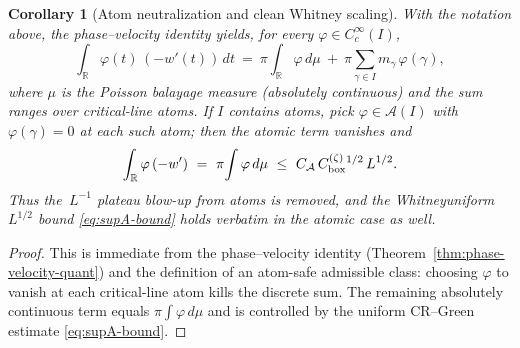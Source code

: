 \documentclass[11pt]{article}
\newtheorem{corollary}[theorem]{Corollary}
\theoremstyle{definition}
\theoremstyle{remark}
\theoremstyle{definition}
\newcommand{\R}{\mathbb{R}}
\begin{document}
\begin{corollary}[Atom neutralization and clean Whitney scaling]\label{cor:atom-safe}
With the notation above, the phase--velocity identity yields, for every \(\varphi\in C_c^\infty(I)\),
\[
  \int_{\R}\varphi(t)\,(-w'(t))\,dt
  \ =\ \pi\!\int_{\R}\varphi\,d\mu\ +\ \pi\sum_{\gamma\in I} m_\gamma\,\varphi(\gamma),
\]
where \(\mu\) is the Poisson balayage measure (absolutely continuous) and the sum ranges over critical-line atoms.
If \(I\) contains atoms, pick \(\varphi\in\mathcal A(I)\) with \(\varphi(\gamma)=0\) at each such atom; then the atomic term vanishes and
\[
  \int_{\R}\varphi\,(-w')\ =\ \pi\!\int \varphi\,d\mu\ \le\ C_{\mathcal A}\,C_{\rm box}^{(\zeta)}{}^{1/2}\,L^{1/2}.
\]
Thus the \(\,L^{-1}\) plateau blow-up from atoms is removed, and the Whitney\-uniform \(L^{1/2}\) bound \eqref{eq:supA-bound}
holds verbatim in the atomic case as well.
\end{corollary}
\begin{proof}
This is immediate from the phase–velocity identity (Theorem~\ref{thm:phase-velocity-quant}) and the definition of an atom-safe admissible class: choosing \(\varphi\) to vanish at each critical-line atom kills the discrete sum. The remaining absolutely continuous term equals \(\pi\int \varphi\,d\mu\) and is controlled by the uniform CR--Green estimate \eqref{eq:supA-bound}.
\end{proof}
\end{document}
